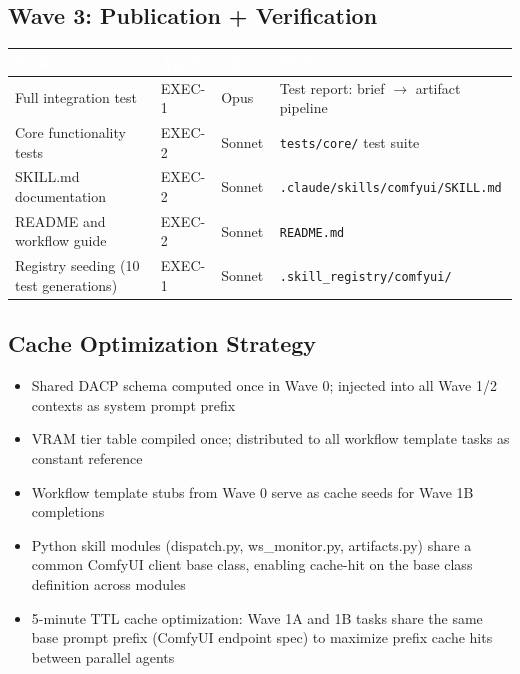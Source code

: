 \documentclass[11pt,letterpaper]{article}
\newcommand{\tableheader}[1]{\textbf{\sffamily\textcolor{white}{#1}}}
\begin{document}
\subsection{Wave 3: Publication + Verification}

\begin{center}
\begin{tabularx}{\textwidth}{L{4.5cm}L{2cm}L{1.8cm}X}
\toprule
{}
\tableheader{Task} & \tableheader{Agent} & \tableheader{Model} & \tableheader{Deliverable} \\
\midrule
Full integration test & EXEC-1 & Opus & Test report: brief $\to$ artifact pipeline \\
Core functionality tests & EXEC-2 & Sonnet & \texttt{tests/core/} test suite \\
SKILL.md documentation & EXEC-2 & Sonnet & \texttt{.claude/skills/comfyui/SKILL.md} \\
README and workflow guide & EXEC-2 & Sonnet & \texttt{README.md} \\
Registry seeding (10 test generations) & EXEC-1 & Sonnet & \texttt{.skill\_registry/comfyui/} \\
\bottomrule
\end{tabularx}
\end{center}

\subsection{Cache Optimization Strategy}

\begin{itemize}[leftmargin=1.5em]
  \item Shared DACP schema computed once in Wave 0; injected into all Wave 1/2 contexts as system prompt prefix
  \item VRAM tier table compiled once; distributed to all workflow template tasks as constant reference
  \item Workflow template stubs from Wave 0 serve as cache seeds for Wave 1B completions
  \item Python skill modules (dispatch.py, ws\_monitor.py, artifacts.py) share a common ComfyUI client base class, enabling cache-hit on the base class definition across modules
  \item 5-minute TTL cache optimization: Wave 1A and 1B tasks share the same base prompt prefix (ComfyUI endpoint spec) to maximize prefix cache hits between parallel agents
\end{itemize}
\end{document}
